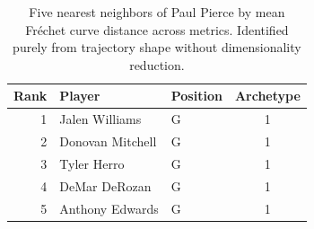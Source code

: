 \begin{table}[htbp]
  \centering\small
  \begin{tabular}{rllc}
    \toprule
    Rank & Player & Position & Archetype \\
    \midrule
    1 & Jalen Williams & G & 1 \\
    2 & Donovan Mitchell & G & 1 \\
    3 & Tyler Herro & G & 1 \\
    4 & DeMar DeRozan & G & 1 \\
    5 & Anthony Edwards & G & 1 \\
    \bottomrule
  \end{tabular}
  \caption{Five nearest neighbors of Paul Pierce by mean Fr\'{e}chet curve distance across metrics. Identified purely from trajectory shape without dimensionality reduction.}
  \label{tab:Paul_Pierce_frechet_curve_neighbors}
\end{table}

